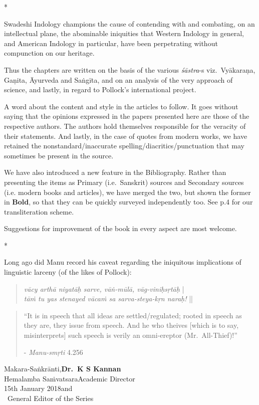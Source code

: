 \centerline{*\quad*\quad*}
\vskip 5pt


Swadeshi Indology champions the cause of contending with and combating, on an intellectual plane, the abominable iniquities that Western Indology in general, and American Indology in particular, have been perpetrating without compunction on our heritage.

\newpage

Thus the chapters are written on the basis of the various {\sl śāstra}-s viz.\ Vyākaraṇa, Gaṇita, Āyurveda and Saṅgīta, and on an analysis of the very approach of science, and lastly, in regard to Pollock's international project.

A word about the content and style in the articles to follow. It goes without saying that the opinions expressed in the papers presented here are those of the respective authors. The authors hold themselves responsible for the veracity of their statements. And lastly, in the case of quotes from modern works, we have retained the nonstandard/inaccurate spelling/diacritics/punctuation that may sometimes be present in the source.

We have also introduced a new feature in the Bibliography. Rather than presenting the items as Primary (i.e.\ Sanskrit) sources and Secondary sources (i.e. modern books and articles), we have merged the two, but shown the former in {\bf Bold}, so that they can be quickly surveyed independently too. See p.4 for 
our transliteration scheme.

Suggestions for improvement of the book in every aspect are most welcome.
\vskip 10pt

\centerline{*\quad*\quad*}
\vskip 5pt


Long ago did Manu record his caveat regarding the iniquitous implications of linguistic larceny (of the likes of Pollock):

\begin{quote}
{{\sl vācy arthā niyatāḥ sarve, vāṅ-mūlā, vāg-viniḥsṛtāḥ}} |\\
{\sl tāṁ tu yas stenayed vācaṁ sa sarva-steya-kṛn naraḥ!} ||
\end{quote}

\begin{quote}
“It is in speech that all ideas are settled/regulated; rooted in speech as they are, they issue from speech. And he who theives [which is to say, misinterprets] such speech is verily an omni-ereptor (Mr.\ All-Thief)!”

\hfill	- {\sl Manu-smṛti} 4.256
\end{quote}
\bigskip

\noindent
Makara-Saṅkrānti,\hfill	{\bf Dr.~K S Kannan}\\
Hemalamba Saṁvatsara\hfill Academic Director\\
15th January 2018\hfill and\\	
\phantom{.}~\hfill General Editor of the Series
